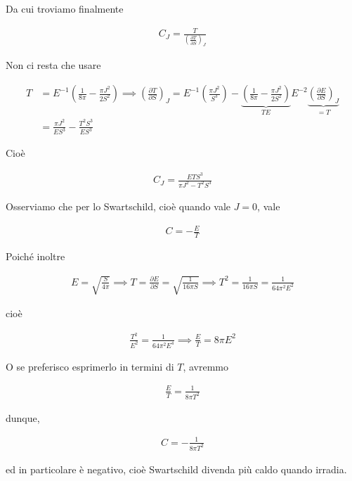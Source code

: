 \documentclass{report}
\begin{document}
Da cui troviamo finalmente 

\begin{align}
    C_J = \frac{T}{\left(\frac{\partial T}{\partial S} \right)_J}
\end{align}

Non ci resta che usare 

\begin{align}
    T &= E^{-1}\left(\frac{1}{8\pi} - \frac{\pi J^2}{2S^2} \right) \implies \left(\frac{\partial T}{\partial S}\right)_J = E^{-1}\left(\frac{\pi J^2}{S^3}\right) - \underbrace{\left(\frac{1}{8\pi} - \frac{\pi J^2}{2S^2}\right)}_{TE}E^{-2}\underbrace{\left(\frac{\partial E}{\partial S}\right)_J}_{=T} \\
    &= \frac{\pi J^2}{ES^3} - \frac{T^2S^3}{ES^3}
\end{align}

Cioè 

\begin{align}
    C_J = \frac{ETS^3}{\pi J^2 -T^2S^3}
\end{align}

Osserviamo che per lo Swartschild, cioè quando vale \(J=0\), vale 

\begin{align}
    C = -\frac{E}{T}
\end{align}

Poiché inoltre 

\begin{align}
    E = \sqrt{\frac{S}{4\pi}} \implies T = \frac{\partial E}{\partial S} = \sqrt{\frac{1}{16\pi S}} \implies T^2 = \frac{1}{16\pi S} = \frac{1}{64\pi^2 E^2}
\end{align}

cioè 

\begin{align}
    \frac{T^2}{E^2} = \frac{1}{64\pi^2 E^4} \implies \frac{E}{T} = 8\pi E^2 
\end{align}

O se preferisco esprimerlo in termini di \(T\), avremmo 

\begin{align}
    \frac{E}{T} = \frac{1}{8\pi T^2}
\end{align}

dunque, 

\begin{align}
    C = -\frac{1}{8\pi T^2}
\end{align}

ed in particolare è negativo, cioè Swartschild divenda più caldo quando irradia. 
\end{document}
